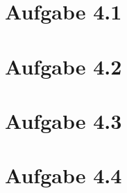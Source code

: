 \documentclass{theozettel}
\begin{document}

\section*{Aufgabe 4.1}


\newpage
\section*{Aufgabe 4.2}


\newpage
\section*{Aufgabe 4.3}


\newpage
\section*{Aufgabe 4.4}
\end{document}
